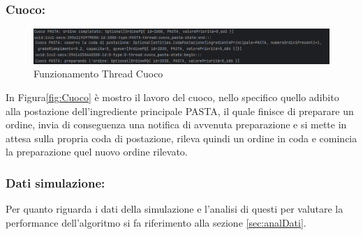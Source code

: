 \subsubsection{Cuoco:}
\begin{figure}[H]
	\centering
	\includegraphics[scale=0.5]{iterazione3/images/Cuoco.png}
	\caption{Funzionamento Thread Cuoco \label{fig:Cuoco}}
\end{figure}
In Figura\vref{fig:Cuoco} è mostro il lavoro del cuoco, nello specifico quello adibito alla postazione dell'ingrediente principale PASTA, il quale finisce di preparare un ordine, invia di conseguenza una notifica di avvenuta preparazione e si mette in attesa sulla propria coda di postazione, rileva quindi un ordine in coda e comincia la preparazione quel nuovo ordine rilevato.
\subsubsection{Dati simulazione:}
Per quanto riguarda i dati della simulazione e l'analisi di questi per valutare la performance dell'algoritmo si fa riferimento alla sezione \vref{sec:analDati}.
\clearpage